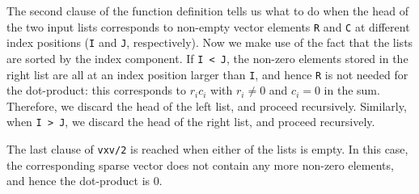 

The second clause of the function definition tells us what to do when
the head of the two input lists corresponds to non-empty vector elements
\lstinline[language=myerlang]{R} and \lstinline[language=myerlang]{C} at different index positions (\lstinline[language=myerlang]{I} and
\lstinline[language=myerlang]{J}, respectively). Now we make use of the fact that the lists
are sorted by the index component. If \lstinline[language=myerlang]{I < J}, the
non-zero elements stored in the right list are all at an index position
larger than \lstinline[language=myerlang]{I}, and hence \lstinline[language=myerlang]{R} is not needed for the
dot-product: this corresponds to $r_i c_i$ with $r_i \neq 0$ and
$c_i = 0$ in the sum. Therefore, we discard the head of the left list,
and proceed recursively. Similarly, when \lstinline[language=myerlang]{I > J}, we
discard the head of the right list, and proceed recursively.

The last clause of \lstinline[language=myerlang]{vxv/2} is reached when either of the lists is
empty. In this case, the corresponding sparse vector does not contain
any more non-zero elements, and hence the dot-product is $0$.

